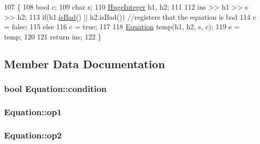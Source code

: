 \begin{DoxyCode}
107 \{
108    \textcolor{keywordtype}{bool} c;
109    \textcolor{keywordtype}{char} s;
110    \hyperlink{classHugeInteger}{HugeInteger} h1, h2;
111 
112    ins >> h1 >> s >> h2;
113    \textcolor{keywordflow}{if}(h1.\hyperlink{classHugeInteger_a49c11f16dad4dbb56d277ddb0eb71342}{isBad}() || h2.isBad()) \textcolor{comment}{//registers that the equation is bad                                  
                                                                                                            }
114       c = \textcolor{keyword}{false};
115    \textcolor{keywordflow}{else}
116       c = \textcolor{keyword}{true};
117 
118    \hyperlink{classEquation}{Equation} temp(h1, h2, s, c);
119    e = temp;
120 
121    \textcolor{keywordflow}{return} ins;
122 \}
\end{DoxyCode}


\subsection{Member Data Documentation}
\subsubsection[{\texorpdfstring{condition}{condition}}]{\setlength{\rightskip}{0pt plus 5cm}bool Equation\+::condition\hspace{0.3cm}{\ttfamily [private]}}\hypertarget{classEquation_a9340b6a41fa360cb1df326c7523b33d1}{}\label{classEquation_a9340b6a41fa360cb1df326c7523b33d1}
\subsubsection[{\texorpdfstring{op1}{op1}}]{ Equation\+::op1\hspace{0.3cm}{\ttfamily [private]}}\hypertarget{classEquation_af03ee24dda87646ad14a87363fe6a459}{}\label{classEquation_af03ee24dda87646ad14a87363fe6a459}
\subsubsection[{\texorpdfstring{op2}{op2}}]{ Equation\+::op2\hspace{0.3cm}{\ttfamily [private]}}\hypertarget{classEquation_ab437f2357b6156b3e70c195cbb9304a5}{}\label{classEquation_ab437f2357b6156b3e70c195cbb9304a5}
